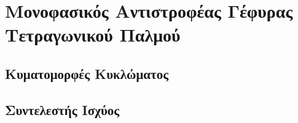 \section{Μονοφασικός Αντιστροφέας Γέφυρας Τετραγωνικού Παλμού }

\subsection{Κυματομορφές Κυκλώματος}
\label{theory:1_phase}




\subsection{Συντελεστής Ισχύος}
\label{subsection2}

